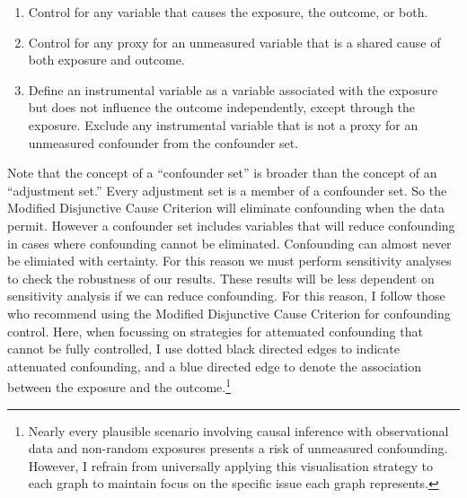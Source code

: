 \documentclass[
  singlecolumn]{article}
\providecommand{\tightlist}{%
  \setlength{\itemsep}{0pt}\setlength{\parskip}{0pt}}\usepackage{longtable,booktabs,array}
\begin{document}
\begin{enumerate}
\def\labelenumi{\alph{enumi}.}
\tightlist
\item
  Control for any variable that causes the exposure, the outcome, or
  both.
\item
  Control for any proxy for an unmeasured variable that is a shared
  cause of both exposure and outcome.
\item
  Define an instrumental variable as a variable associated with the
  exposure but does not influence the outcome independently, except
  through the exposure. Exclude any instrumental variable that is not a
  proxy for an unmeasured confounder from the confounder set.
\end{enumerate}

Note that the concept of a ``confounder set'' is broader than the
concept of an ``adjustment set.'' Every adjustment set is a member of a
confounder set. So the Modified Disjunctive Cause Criterion will
eliminate confounding when the data permit. However a confounder set
includes variables that will reduce confounding in cases where
confounding cannot be eliminated. Confounding can almost never be
elimiated with certainty. For this reason we must perform sensitivity
analyses to check the robustness of our results. These results will be
less dependent on sensitivity analysis if we can reduce confounding. For
this reason, I follow those who recommend using the Modified Disjunctive
Cause Criterion for confounding control. Here, when focussing on
strategies for attenuated confounding that cannot be fully controlled, I
use dotted black directed edges to indicate attenuated confounding, and
a blue directed edge to denote the association between the exposure and
the outcome.\footnote{Nearly every plausible scenario involving causal
  inference with observational data and non-random exposures presents a
  risk of unmeasured confounding. However, I refrain from universally
  applying this visualisation strategy to each graph to maintain focus
  on the specific issue each graph represents.}
\end{document}
